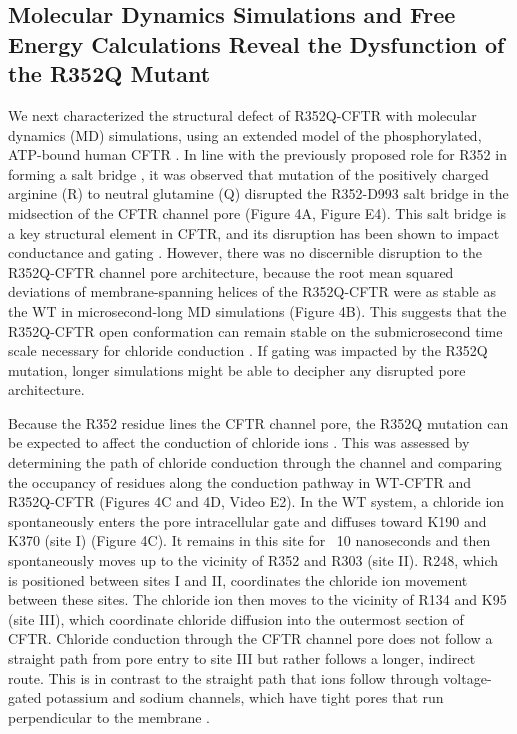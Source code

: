 \subsection{Molecular Dynamics Simulations and Free Energy Calculations Reveal the Dysfunction of the R352Q Mutant}


We next characterized the structural defect of R352Q-CFTR with molecular dynamics (MD) simulations, using an extended model of the phosphorylated, ATP-bound human CFTR \cite{wong2022}. In line with the previously proposed role for R352 in forming a salt bridge \cite{cui2008}, it was observed that mutation of the positively charged arginine (R) to neutral glutamine (Q) disrupted the R352-D993 salt bridge in the midsection of the CFTR channel pore (Figure 4A, Figure E4). This salt bridge is a key structural element in CFTR, and its disruption has been shown to impact conductance and gating \cite{cui2008}. However, there was no discernible disruption to the R352Q-CFTR channel pore architecture, because the root mean squared deviations of membrane-spanning helices of the R352Q-CFTR were as stable as the WT in microsecond-long MD simulations (Figure 4B). This suggests that the R352Q-CFTR open conformation can remain stable on the submicrosecond time scale necessary for chloride conduction \cite{sorum2015}. If gating was impacted by the R352Q mutation, longer simulations might be able to decipher any disrupted pore architecture.

Because the R352 residue lines the CFTR channel pore, the R352Q mutation can be expected to affect the conduction of chloride ions \cite{zhang2018}. This was assessed by determining the path of chloride conduction through the channel and comparing the occupancy of residues along the conduction pathway in WT-CFTR and R352Q-CFTR (Figures 4C and 4D, Video E2). In the WT system, a chloride ion spontaneously enters the pore intracellular gate \cite{linsdell2018} and diffuses toward K190 and K370 (site I) (Figure 4C). It remains in this site for ~10 nanoseconds and then spontaneously moves up to the vicinity of R352 and R303 (site II). R248, which is positioned between sites I and II, coordinates the chloride ion movement between these sites. The chloride ion then moves to the vicinity of R134 and K95 (site III), which coordinate chloride diffusion into the outermost section of CFTR. Chloride conduction through the CFTR channel pore does not follow a straight path from pore entry to site III but rather follows a longer, indirect route. This is in contrast to the straight path that ions follow through voltage-gated potassium and sodium channels, which have tight pores that run perpendicular to the membrane \cite{flood2019}.

